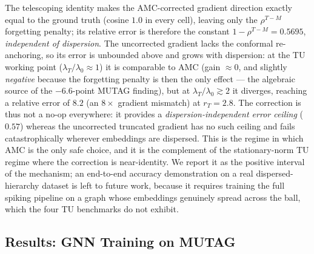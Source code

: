 \documentclass[a4paper,fleqn]{cas-dc}
\begin{document}
The telescoping identity makes the AMC-corrected gradient direction exactly
equal to the ground truth (cosine $1.0$ in every cell), leaving only the
$\rho^{T-M}$ forgetting penalty; its relative error is therefore the constant
$1-\rho^{T-M}=0.5695$, \emph{independent of dispersion}. The uncorrected
gradient lacks the conformal re-anchoring, so its error is unbounded above and
grows with dispersion: at the TU working point ($\lambda_T/\lambda_0\approx1$)
it is comparable to AMC (gain $\approx0$, and slightly \emph{negative} because
the forgetting penalty is then the only effect --- the algebraic source of the
$-6.6$-point MUTAG finding), but at $\lambda_T/\lambda_0\gtrsim2$ it diverges,
reaching a relative error of $8.2$ (an $8\times$ gradient mismatch) at
$r_T{=}2.8$. The correction is thus not a no-op everywhere: it provides a
\emph{dispersion-independent error ceiling} ($0.57$) whereas the uncorrected
truncated gradient has no such ceiling and fails catastrophically wherever
embeddings are dispersed. This is the regime in which AMC is the only safe
choice, and it is the complement of the stationary-norm TU regime where the
correction is near-identity. We report it as the positive interval of the
mechanism; an end-to-end accuracy demonstration on a real dispersed-hierarchy
dataset is left to future work, because it requires training the full spiking
pipeline on a graph whose embeddings genuinely spread across the ball, which the
four TU benchmarks do not exhibit.

\subsection{Results: GNN Training on MUTAG}
\end{document}
